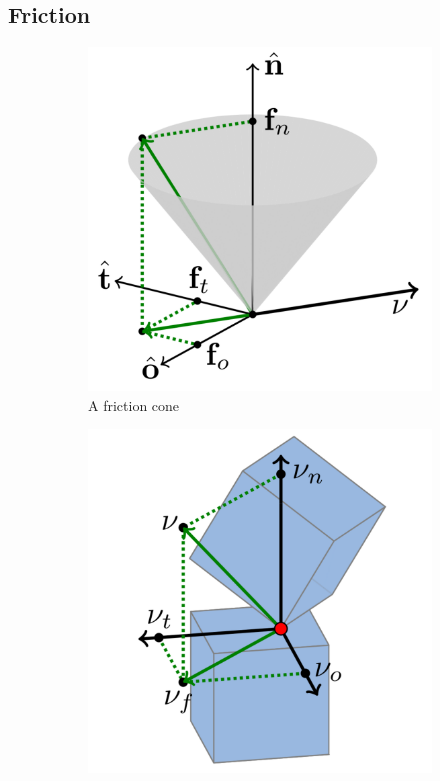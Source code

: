 \subsection{Friction}
\begin{figure}[htp]
\center
\begin{subfigure}[b]{0.45\textwidth}
	\includegraphics[width=\textwidth]{figures/friction_cone}
	\caption{A friction cone}
	\label{fig:friction_cone}
\end{subfigure}
\hfill
\begin{subfigure}[b]{0.47\textwidth}
	\includegraphics[width=\textwidth]{figures/friction_cube}

\end{subfigure}
\end{figure}
